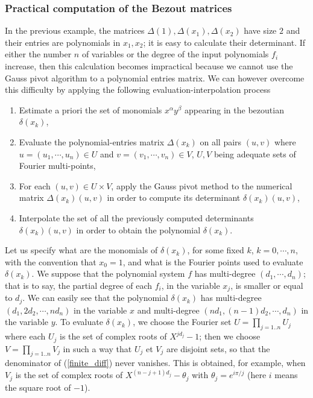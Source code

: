 \documentclass{standalone}
\begin{document}
\subsubsection{Practical computation of the Bezout matrices}
In the previous example, the matrices $\Delta(1), \Delta(x_1), \Delta(x_2)$ have size $2$ and their entries are polynomials in $x_1, x_2$; it is easy to calculate their determinant. If either the number  $n$ of variables or the degree of the input polynomials $f_i$ increase, then this calculation becomes impractical because we cannot use the Gauss pivot algorithm to a polynomial entries matrix. We can however overcome this difficulty by applying the following evaluation-interpolation process
\begin{enumerate}
\item
Estimate a priori the set of monomials $x^\alpha y^\beta$ appearing in the bezoutian $\delta(x_k)$,
\item
Evaluate the polynomial-entries matrix $\Delta(x_k)$ on all pairs $(u, v)$ where $u = (u_1,\cdots, u_n) \in U$ and $v = (v_1,\cdots, v_n) \in V$, $U, V$ being adequate sets of Fourier multi-points,
\item
For each $(u, v) \in U\times V$, apply the Gauss pivot method to the numerical matrix $\Delta(x_k)(u, v)$ in order to compute its determinant $\delta(x_k)(u, v)$,
\item
Interpolate the set of all the previously computed determinants $\delta(x_k)(u, v)$ in order to obtain the polynomial $\delta(x_k)$.
\end{enumerate}
Let us specify what are the monomials of $\delta(x_k)$, for some fixed $k$, $k = 0,\cdots, n$, with the convention that $x_0 = 1$, and what is the Fourier points used to evaluate $\delta(x_k)$. We suppose that the polynomial system $f$ has multi-degree $(d_1, \cdots, d_n)$; that is to say, the partial degree of each $f_i$, in the variable $x_j$, is smaller or equal to $d_j$. We can easily see that the polynomial $\delta(x_k)$ has multi-degree $(d_1, 2d_2, \cdots, nd_n)$ in the variable $x$ and multi-degree $(nd_1, (n-1)d_2, \cdots, d_n)$ in the variable $y$. To evaluate $\delta(x_k)$, we choose the Fourier set $U = \prod_{j=1..n} U_j$ where each $U_j$ is the set of complex roots of $X^{jd_j} - 1$; then we choose $V = \prod_{j=1..n} V_j$ in such a way that $U_j$ et $V_j$ are disjoint sets, so that the denominator of (\ref{finite_diff}) never vanishes. This is obtained, for example, when $V_j$ is the set of complex roots of $X^{(n-j+1)d_j} - \theta_j$ with $\theta_j = e^{i\pi/j}$ (here $i$ means the square root of $-1$). 
\end{document}
